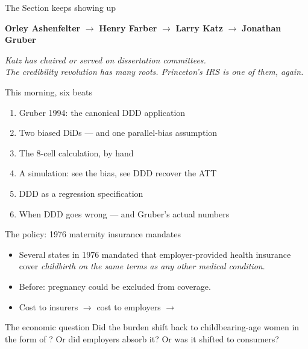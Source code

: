\documentclass[aspectratio=169,11pt]{beamer}
\begin{document}
\begin{frame}{The Section keeps showing up}
\vspace{1.6em}
\begin{center}
\Large
\textbf{Orley Ashenfelter} \;$\longrightarrow$\; \textbf{Henry Farber} \;$\longrightarrow$\; \textbf{Larry Katz} \;$\longrightarrow$\; \textbf{Jonathan Gruber}
\end{center}
\vspace{2em}
\begin{center}
\small\color{warmgray}\itshape
Katz has chaired or served on  dissertation committees. \\[0.2em]
The credibility revolution has many roots. \;Princeton's IRS is one of them, again.
\end{center}
\end{frame}

\begin{frame}{This morning, six beats}
\vspace{0.4em}
\begin{enumerate}
  \item Gruber 1994: the canonical DDD application
  \item Two biased DiDs --- and one parallel-bias assumption
  \item The 8-cell calculation, by hand
  \item A simulation: see the bias, see DDD recover the ATT
  \item DDD as a regression specification
  \item When DDD goes wrong --- and Gruber's actual numbers
\end{enumerate}
\end{frame}


\begin{frame}{The policy: 1976 maternity insurance mandates}
\vspace{0.4em}
\begin{itemize}
  \item Several states in 1976 mandated that employer-provided health insurance cover \textit{childbirth on the same terms as any other medical condition}.
  \item Before: pregnancy could be excluded from coverage.
  \item Cost to insurers $\rightarrow$ cost to employers $\rightarrow$ 
\end{itemize}
\vspace{0.5em}
\begin{block}{The economic question}
\small
Did the burden shift back to childbearing-age women in the form of ? Or did employers absorb it? Or was it shifted to consumers?
\end{block}
\end{frame}
\end{document}
